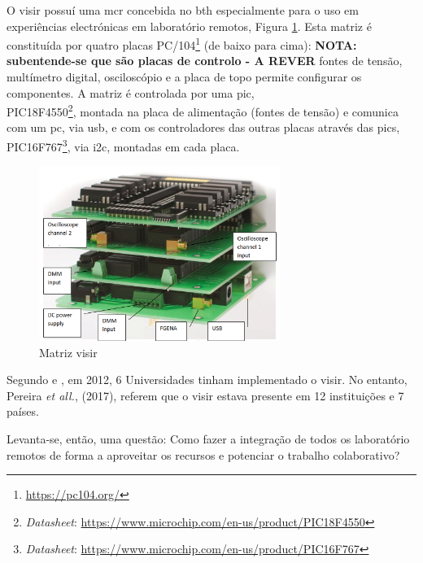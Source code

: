 O \acrshort{visir} possuí uma \acrfull{mcr} concebida no \acrshort{bth} especialmente para o uso em experiências electrónicas em \acrshort{laboratório remoto}s, Figura \ref{fig:matrizvisir}. Esta matriz é constituída por quatro placas PC/104\footnote{\url{https://pc104.org/}} (de baixo para cima): \textbf{NOTA: subentende-se que são placas de controlo - A REVER} fontes de tensão, multímetro digital, osciloscópio e a placa de topo permite configurar os componentes. A matriz é controlada por uma \acrfull{pic}, \\PIC18F4550\footnote{\textit{Datasheet}: \url{https://www.microchip.com/en-us/product/PIC18F4550}}, montada na placa de alimentação (fontes de tensão) e comunica com um \acrshort{pc}, via \acrshort{usb}, e com os controladores das outras placas através das \acrshort{pic}s, PIC16F767\footnote{\textit{Datasheet}: \url{https://www.microchip.com/en-us/product/PIC16F767}}, via \acrfull{i2c}, montadas em cada placa\cite{matriz}.

\begin{figure}[hbtp]
                \centering
                \includegraphics[width=0.7\textwidth]{figures/matriz.png}
                \caption{Matriz \acrshort{visir}\cite{matriz}}
                \label{fig:matrizvisir}
        \end{figure}

Segundo \cite{tawfikexperiences} e \cite{tawfikvisir}, em 2012, 6 Universidades tinham implementado o \acrshort{visir}. No entanto, Pereira \textit{et all.}, (2017), referem que o \acrshort{visir} estava presente em 12 instituições e 7 países\cite{pereira}.

\vspace{0.5cm}
Levanta-se, então, uma questão: Como fazer a integração de todos os \acrshort{laboratório remoto}s de forma a aproveitar os recursos e potenciar o trabalho colaborativo?
\vspace{0.5cm}

